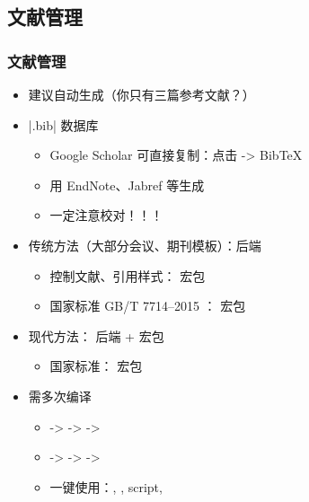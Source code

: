 \subsection{文献管理}
\begin{frame}[fragile]
    \frametitle{文献管理}
    \begin{itemize}
        \item 建议自动生成\pause （你只有三篇参考文献？）\pause
        \item |.bib| 数据库
              \begin{itemize}
                  \item Google Scholar 可直接复制：点击 \faQuoteRight \quad -> BibTeX
                  \item 用 EndNote、Jabref 等生成
                  \item \alert{一定注意校对！！！}
              \end{itemize} \pause
        \item 传统方法（大部分会议、期刊模板）：\BibTeX  后端
              \begin{itemize}
                  \item 控制文献、引用样式： 宏包
                  \item 国家标准 GB/T 7714--2015
                        ：
                        \alert{ 宏包}
              \end{itemize} \pause
        \item 现代方法： 后端 +  宏包

              \begin{itemize}
                  \item 国家标准： 宏包
              \end{itemize} \pause

        \item 需多次编译
              \begin{itemize}
                  \item \pdfLaTeX -> \BibTeX -> \pdfLaTeX -> \pdfLaTeX
                  \item \XeLaTeX -> \BibTeX -> \XeLaTeX -> \XeLaTeX
                  \item 一键使用：, ,  script, 
              \end{itemize}

    \end{itemize}
\end{frame}

